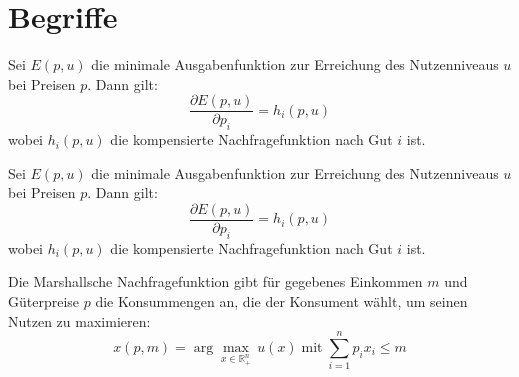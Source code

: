 \chapter{Begriffe}


\begin{lemma} 
	Sei \( E(p, u) \) die minimale Ausgabenfunktion zur Erreichung des Nutzenniveaus \( u \) bei Preisen \( p \). Dann gilt:
	\[
		\frac{\partial E(p, u)}{\partial p_i} = h_i(p, u)
	\]
	wobei \( h_i(p, u) \) die kompensierte Nachfragefunktion nach Gut \( i \) ist.
\end{lemma}
\begin{lemma}
	Sei \( E(p, u) \) die minimale Ausgabenfunktion zur Erreichung des Nutzenniveaus \( u \) bei Preisen \( p \). Dann gilt:
	\[
		\frac{\partial E(p, u)}{\partial p_i} = h_i(p, u)
	\]
	wobei \( h_i(p, u) \) die kompensierte Nachfragefunktion nach Gut \( i \) ist.
\end{lemma}

\begin{definition} 
	Die Marshallsche Nachfragefunktion gibt für gegebenes Einkommen \( m \) und Güterpreise \( p \) die Konsummengen an, die der Konsument wählt, um seinen Nutzen zu maximieren:
	\[
		x(p, m) = \arg\max_{x \in \mathbb{R}^n_+} \, u(x) \; \text{mit} \; \sum_{i=1}^n p_i x_i \leq m
	\]
\end{definition}

